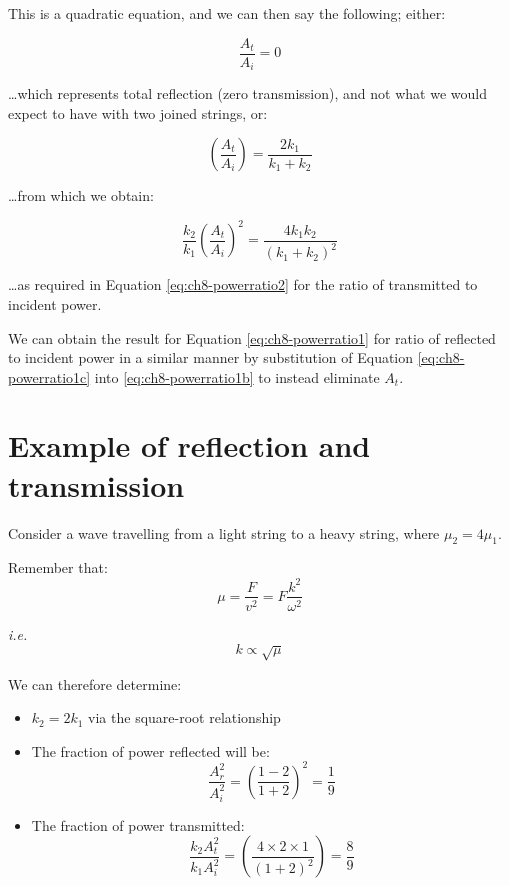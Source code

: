 \documentclass[
]{book}
\providecommand{\tightlist}{%
  \setlength{\itemsep}{0pt}\setlength{\parskip}{0pt}}
\begin{document}
This is a quadratic equation, and we can then say the following; either:

\begin{equation}
\frac{A_t}{A_i} = 0
\end{equation}

\ldots which represents total reflection (zero transmission), and not what we would expect to have with two joined strings, or:

\begin{equation}
\left(\frac{A_t}{A_i}\right) = \frac{2k_1}{k_1 + k_2}
\end{equation}

\ldots from which we obtain:

\begin{equation}
\frac{k_2}{k_1} \left(\frac{A_t}{A_i}\right)^2 = \frac{4k_1 k_2}{(k_1 + k_2)^2}
\end{equation}

\ldots as required in Equation \eqref{eq:ch8-powerratio2} for the ratio of transmitted to incident power.

We can obtain the result for Equation \eqref{eq:ch8-powerratio1} for ratio of reflected to incident power in a similar manner by substitution of Equation \eqref{eq:ch8-powerratio1c} into \eqref{eq:ch8-powerratio1b} to instead eliminate \(A_t\).

\hypertarget{sec-ch8-examplereflectiontransmission}{%
\section{Example of reflection and transmission}\label{sec-ch8-examplereflectiontransmission}}

Consider a wave travelling from a light string to a heavy string, where \(\mu_2 = 4\mu_1\).

Remember that:
\begin{equation}
\mu = \frac{F}{v^2} = F\frac{k^2}{\omega^2}
\end{equation}

\emph{i.e.}
\begin{equation}
k \propto \sqrt{\mu}
\end{equation}

We can therefore determine:

\begin{itemize}
\tightlist
\item
  \(k_2 = 2 k_1\) via the square-root relationship
\item
  The fraction of power reflected will be:
  \begin{equation}
  \frac{A_r^2}{A_i^2} = \left( \frac{1-2}{1+2}\right)^2 = \frac{1}{9}
  \end{equation}
\item
  The fraction of power transmitted:
  \begin{equation}
  \frac{k_2 A_t^2}{k_1 A_i^2} = \left( \frac{4 \times 2 \times 1}{(1+2)^2}\right) = \frac{8}{9}
  \end{equation}
\end{itemize}
\end{document}
